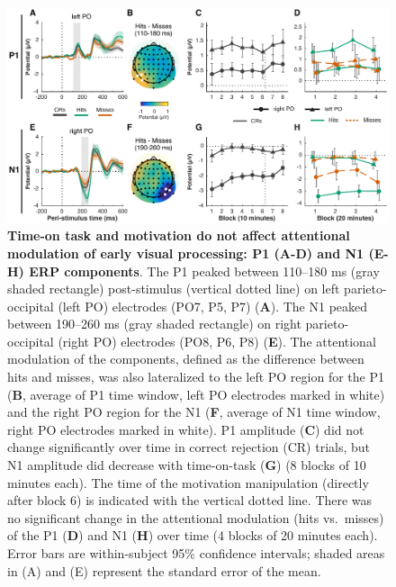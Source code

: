 \documentclass[11pt,english,]{memoir}
\newcommand{\blandscape}{\begin{landscape}}
\newcommand{\elandscape}{\end{landscape}}
\def\defstyle{Ruled} %
\begin{document}
\newpage
\pagestyle{empty}
\changetext{}{}{}{-12.5mm}{}
\blandscape
\captionsetup{width=\linewidth}



\begin{figure}
\includegraphics[width=190mm]{MFBrain_files/figures/figure_4_ERPs} \caption{\textbf{Time-on task and motivation do not affect attentional modulation of early visual processing: P1 (A-D) and N1 (E-H) ERP components}. The P1 peaked between 110--180 ms (gray shaded rectangle) post-stimulus (vertical dotted line) on left parieto-occipital (left PO) electrodes (PO7, P5, P7) (\textbf{A}). The N1 peaked between 190--260 ms (gray shaded rectangle) on right parieto-occipital (right PO) electrodes (PO8, P6, P8) (\textbf{E}). The attentional modulation of the components, defined as the difference between hits and misses, was also lateralized to the left PO region for the P1 (\textbf{B}, average of P1 time window, left PO electrodes marked in white) and the right PO region for the N1 (\textbf{F}, average of N1 time window, right PO electrodes marked in white). P1 amplitude (\textbf{C}) did not change significantly over time in correct rejection (CR) trials, but N1 amplitude did decrease with time-on-task (\textbf{G}) (8 blocks of 10 minutes each). The time of the motivation manipulation (directly after block 6) is indicated with the vertical dotted line. There was no significant change in the attentional modulation (hits vs.~misses) of the P1 (\textbf{D}) and N1 (\textbf{H}) over time (4 blocks of 20 minutes each). Error bars are within-subject \autocites{Cousineau2005}{Morey2008} 95\% confidence intervals; shaded areas in (A) and (E) represent the standard error of the mean.}\label{fig:figure-4-ERPs}
\end{figure}

\newpage
\elandscape
\changetext{}{}{}{+12.5mm}{}
\pagestyle{\defstyle}
\captionsetup{width=\textwidth}
\end{document}
